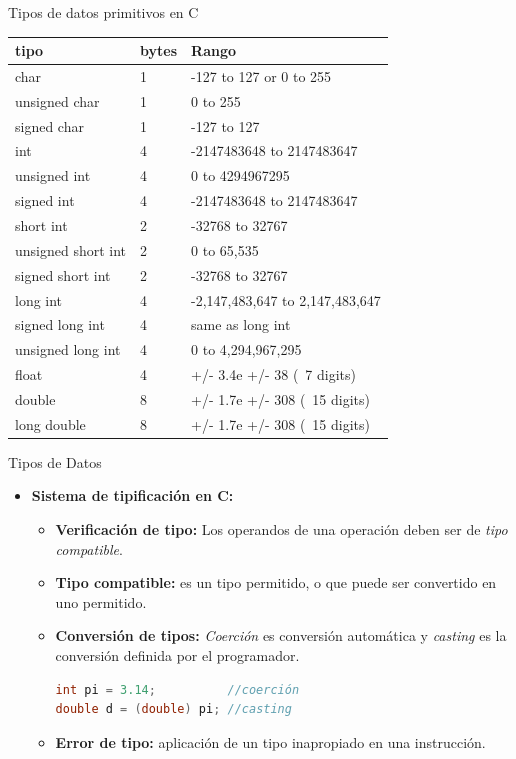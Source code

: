 \documentclass{beamer}
\begin{document}
\begin{frame}[fragile]{Tipos de datos primitivos en C}
\vspace{-.25cm}
\begin{center}
	\small
	\begin{tabular}{|l|l|l|}\hline \hline
		tipo & bytes & Rango\\ \hline 
		char & 1 & -127 to 127 or 0 to 255\\ \hline 
		unsigned char & 1 & 0 to 255\\ \hline 
		signed char & 1 & -127 to 127\\ \hline 
		int & 4 & -2147483648 to 2147483647\\ \hline 
		unsigned int & 4 & 0 to 4294967295\\ \hline 
		signed int & 4 & -2147483648 to 2147483647\\ \hline 
		short int & 2 & -32768 to 32767\\ \hline 
		unsigned short int & 2 & 0 to 65,535\\ \hline 
		signed short int & 2 & -32768 to 32767\\ \hline 
		long int & 4 & -2,147,483,647 to 2,147,483,647\\ \hline 
		signed long int & 4 & same as long int\\ \hline 
		unsigned long int & 4 & 0 to 4,294,967,295\\ \hline 
		float & 4 & +/- 3.4e +/- 38 (~7 digits)\\ \hline 
		double & 8  & +/- 1.7e +/- 308 (~15 digits)\\ \hline 
		long double & 8  & +/- 1.7e +/- 308 (~15 digits)\\ \hline 
	\end{tabular}
\end{center}
\end{frame}

\begin{frame}[fragile]{Tipos de Datos}
\begin{itemize}
	\item \textbf{Sistema de tipificación en C:}
	\begin{itemize}
		\item \textbf{Verificación de tipo:} Los operandos de una operación deben ser de \emph{tipo compatible}.
		\item \textbf{Tipo compatible:} es un tipo permitido, o que puede ser convertido en uno permitido.
		\item \textbf{Conversión de tipos:} \emph{Coerción} es conversión automática y \emph{casting} es la conversión definida por el programador.
		\begin{lstlisting}[language=C]
int pi = 3.14;          //coerción
double d = (double) pi; //casting       
		\end{lstlisting}
		\item \textbf{Error de tipo:} aplicación de un tipo inapropiado en una instrucción.
	\end{itemize}
\end{itemize}
\end{frame}
\end{document}
